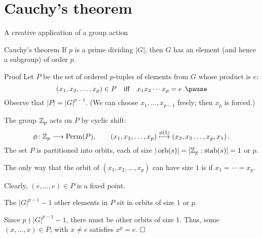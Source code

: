 \documentclass[8pt, handout]{beamer}
\newcommand{\Pause}{\pause}      %
\begin{document}
\section*{Cauchy's theorem}
\begin{frame}{A creative application of a group action}

  \begin{block}{Cauchy's theorem} 
    If $p$ is a prime dividing $|G|$, then $G$ has an element (and
    hence a subgroup) of order $p$.
  \end{block}
  
  \begin{exampleblock}{Proof} \Pause
    Let $P$ be the set of ordered $p$-tuples of
    elements from $G$ whose product is $e$: \vspace{-1mm}
    \[
    (x_1,x_2,\dots,x_p)\in P\quad\mbox{iff}\quad x_1x_2\cdots
    x_p=e\,. \Pause
    \]
    Observe that $|P|=|G|^{p-1}$. (We can choose
    $x_1,\dots,x_{p-1}$ freely; then $x_p$ is forced.)
    
    \pause\medskip 
    
    The group $\mathbb{Z}_p$ acts on $P$ by cyclic shift: \vspace{-2
      mm}
    \[
    \phi\colon\Z_p\longrightarrow\Perm(P),\qquad
    (x_1,x_2,\dots,x_p)\stackrel{\phi(1)}{\longmapsto}
    (x_2,x_3\dots,x_p,x_1)\,. %
    \]
    \Pause The set $P$ is partitioned into orbits, each of size
    $|\operatorname{orb}(s)|=[\mathbb{Z}_p:\operatorname{stab}(s)]=1$ or $p$.
        
    \pause\medskip
    
    The only way that the orbit of $(x_1,x_2,\dots,x_p)$
    can have size $1$ is if $x_1=\cdots=x_p$.

    \Pause\medskip

    Clearly, $(e,\dots,e)\in P$ is a fixed point.
    
    \Pause\medskip
    
    The $|G|^{p-1}-1$ other elements in $P$ sit in orbits of size $1$
    or $p$.
    
    \pause\medskip
    
    Since $p\nmid |G|^{p-1}-1$, there must be other orbits of size
    $1$. \Pause Thus, some $(x,\dots,x)\in P$, with $x\neq e$ satisfies
    $x^p=e$. $\hfill\Box$
  \end{exampleblock}
  
\end{frame}

\end{document}

